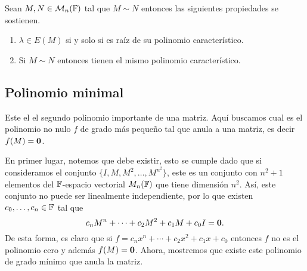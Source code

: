 \begin{teor}
  Sean $M, N \in \mathcal{M}_n(\mathbb{F})$ tal que $M \sim N$ entonces las siguientes propiedades se sostienen.
  \begin{enumerate}
    \item $\lambda \in E(M)$ si y solo si es raíz de su polinomio característico.
    \item Si $M \sim N$ entonces tienen el mismo polinomio característico.
  \end{enumerate}
\end{teor}



\subsection{Polinomio minimal}

Este el el segundo polinomio importante de una matriz. Aquí buscamos cual es el polinomio no nulo $f$ de grado más pequeño tal que anula a una matriz, es decir $f(M) = \mathbf{0}$.

En primer lugar, notemos que debe existir, esto se cumple dado que si consideramos el conjunto $\{I,M,M^2,\ldots,M^{n^2}\}$, este es un conjunto con $n^2+1$ elementos del $\mathbb{F}$-espacio vectorial $M_n(\mathbb{F})$ que tiene dimensión $n^2$. Así, este conjunto no puede ser linealmente independiente, por lo que existen $c_0,\ldots,c_n\in \mathbb{F}$ tal que 
\[ c_n M^n + \cdots + c_2 M^2 + c_1 M + c_0 I = \mathbf{0}. \]
De esta forma, es claro que si $f = c_n x^n + \cdots + c_2 x^2 + c_1 x + c_0$ entonces $f$ no es el polinomio cero y además $f(M) = \mathbf{0}$. Ahora, mostremos que existe este polinomio de grado mínimo que anula la matriz.

